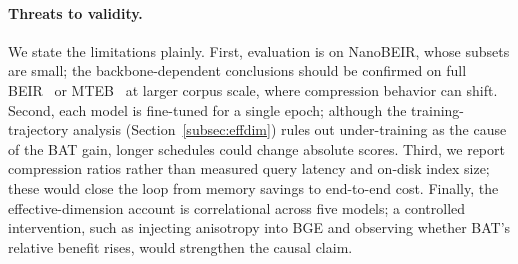 \paragraph{Threats to validity.}
We state the limitations plainly. First, evaluation is on NanoBEIR, whose
subsets are small; the backbone-dependent conclusions should be confirmed on
full BEIR~\citep{thakur2021beir} or MTEB~\citep{muennighoff2022mteb} at larger
corpus scale, where compression behavior can shift. Second, each model is
fine-tuned for a single epoch; although the training-trajectory analysis
(Section~\ref{subsec:effdim}) rules out under-training as the cause of the BAT
gain, longer schedules could change absolute scores. Third, we report
compression ratios rather than measured query latency and on-disk index size;
these would close the loop from memory savings to end-to-end cost. Finally, the
effective-dimension account is correlational across five models; a controlled
intervention, such as injecting anisotropy into BGE and observing whether BAT's
relative benefit rises, would strengthen the causal claim.
